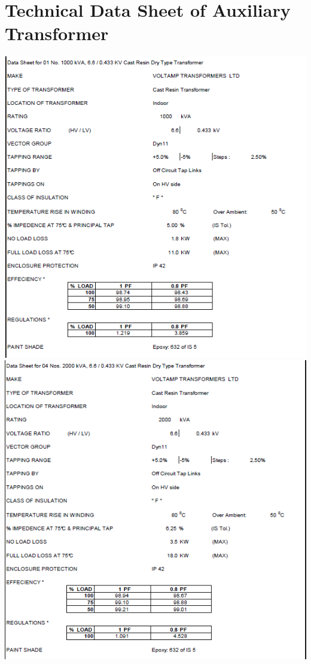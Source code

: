 \documentclass[english,11pt]{report}
\begin{document}
\section{Technical Data Sheet of Auxiliary Transformer}
\includegraphics[width =6in]{stgtech1.png} 
\includegraphics[width =6in]{stgtech2.png} 
\end{document}
